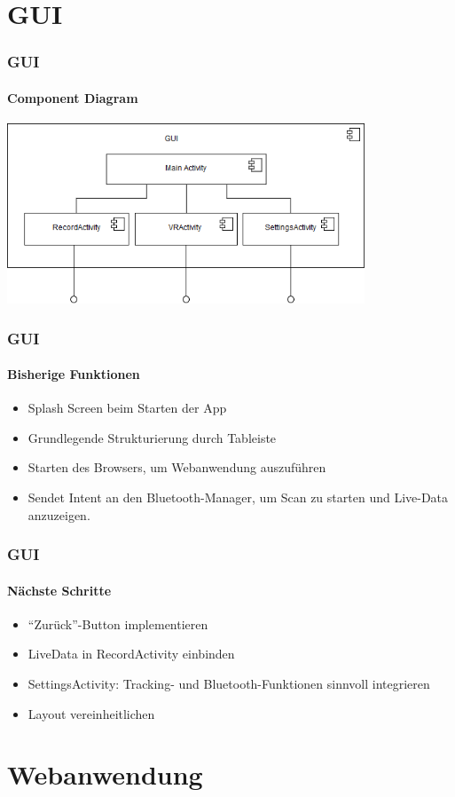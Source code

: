 \documentclass{beamer}
\begin{document}
\section{GUI}

\begin{frame}
\frametitle{GUI}
\framesubtitle{Component Diagram}
\hspace{1cm} \includegraphics[width=0.8\textwidth]{../doc/SDD/pics/GUI-component.png}
\end{frame}

\begin{frame}
\frametitle{GUI}
\framesubtitle{Bisherige Funktionen}
\begin{itemize}
  \item Splash Screen beim Starten der App
  \item Grundlegende Strukturierung durch Tableiste 
  \item Starten des Browsers, um Webanwendung auszuf\"uhren
  \item Sendet Intent an den Bluetooth-Manager, um Scan zu starten und Live-Data anzuzeigen.
\end{itemize}
\end{frame}

\begin{frame}
\frametitle{GUI}
\framesubtitle{N\"achste Schritte}
\begin{itemize}
  \item ``Zur\"uck''-Button implementieren 
  \item LiveData in RecordActivity einbinden
  \item SettingsActivity: Tracking- und Bluetooth-Funktionen sinnvoll integrieren
  \item Layout vereinheitlichen
\end{itemize}
\end{frame}

\section{Webanwendung}
\end{document}
